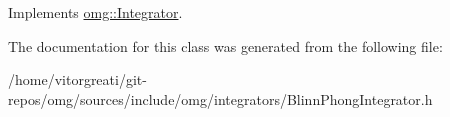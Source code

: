 Implements \mbox{\hyperlink{classomg_1_1_integrator_a2922583794310f6b1ff8ee121666f7a1}{omg\+::\+Integrator}}.



The documentation for this class was generated from the following file\+:\begin{DoxyCompactItemize}
\item 
/home/vitorgreati/git-\/repos/omg/sources/include/omg/integrators/Blinn\+Phong\+Integrator.\+h\end{DoxyCompactItemize}
